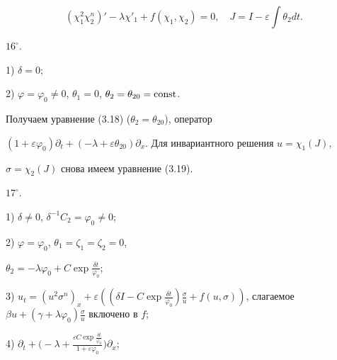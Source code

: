 \begin{equation} 


(\chi^2_1\chi^n_2)'-\lambda\chi'_1+f(\chi_1,\chi_2)=0,\quad 


J=I-\varepsilon\int\theta_2dt. \tag{3.19} 


\end{equation} 


 


\noindent{}$16^\circ$. 


 


1) $\delta=0$; 


 


2) $\varphi=\varphi_0\ne0$, $\theta_1=0$, $\theta_2=\theta_{20}=\operatorname{const}$. 


Получаем уравнение (3.18) ($\theta_2=\theta_{20}$), оператор 


$(1+\varepsilon\varphi_0)\partial_t+(-\lambda+\varepsilon\theta_{20}) 


\partial_x$. Для инвариантного решения $u=\chi_1(J)$, 


$\sigma=\chi_2(J)$ снова имеем уравнение (3.19). 


 


\noindent{}$17^\circ$. 


 


1) $\delta\ne0$, $\delta^{-1}C_2=\varphi_0\ne0$; 


 


2) $\varphi=\varphi_0$, $\theta_1=\zeta_1=\zeta_2=0$, 


$\theta_2=-\lambda\varphi_0+C\exp\frac{\delta t}{\varphi_0}$; 


 


3) $u_t=(u^2\sigma^n)_x+\varepsilon((\delta I-C\exp\frac{\delta 


t}{\varphi_0})\frac{\sigma}{u}+f(u,\sigma))$, слагаемое $\beta 


u+(\gamma+\lambda\varphi_0)\frac{\sigma}{u}$ включено в $f$; 


 


4) $\partial_t+\big(-\lambda+\frac{\varepsilon C 


\exp\frac{\delta t}{\varphi_0}} 


{1+\varepsilon\varphi_0}\big)\partial_x$; 


